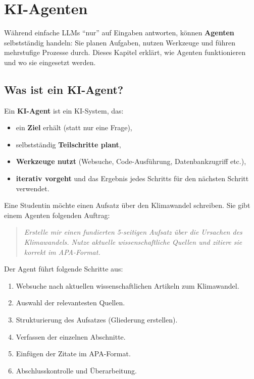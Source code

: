 \chapter{KI-Agenten}\label{ch:K05_Agenten}

\begin{myremark}
      Während einfache LLMs \enquote{nur} auf Eingaben antworten, können \textbf{Agenten}
      selbstständig handeln: Sie planen Aufgaben, nutzen Werkzeuge und führen mehrstufige
      Prozesse durch. Dieses Kapitel erklärt, wie Agenten funktionieren und wo sie
      eingesetzt werden.
\end{myremark}

\section{Was ist ein KI-Agent?}

\begin{mydefinition}
      Ein \textbf{KI-Agent} ist ein KI-System, das:
      \begin{itemize}
            \item ein \textbf{Ziel} erhält (statt nur eine Frage),
            \item selbstständig \textbf{Teilschritte plant},
            \item \textbf{Werkzeuge nutzt} (Websuche, Code-Ausführung, Datenbankzugriff etc.),
            \item \textbf{iterativ vorgeht} und das Ergebnis jedes Schritts für den
                  nächsten Schritt verwendet.
      \end{itemize}
\end{mydefinition}

\begin{myexample}
      Eine Studentin möchte einen Aufsatz über den Klimawandel schreiben. Sie gibt
      einem Agenten folgenden Auftrag:

      \begin{quote}
            \textit{Erstelle mir einen fundierten 5-seitigen Aufsatz über die Ursachen
                  des Klimawandels. Nutze aktuelle wissenschaftliche Quellen und zitiere sie
                  korrekt im APA-Format.}
      \end{quote}

      Der Agent führt folgende Schritte aus:
      \begin{enumerate}
            \item Websuche nach aktuellen wissenschaftlichen Artikeln zum Klimawandel.
            \item Auswahl der relevantesten Quellen.
            \item Strukturierung des Aufsatzes (Gliederung erstellen).
            \item Verfassen der einzelnen Abschnitte.
            \item Einfügen der Zitate im APA-Format.
            \item Abschlusskontrolle und Überarbeitung.
      \end{enumerate}
\end{myexample}

